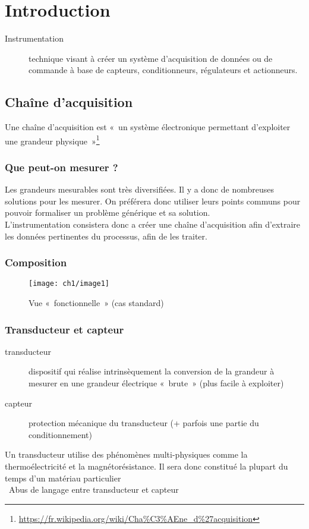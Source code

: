 \chapter{Introduction}
\begin{description}
	\item[Instrumentation] technique visant à créer un système d'acquisition de données ou de commande à base de capteurs, conditionneurs, régulateurs et actionneurs.
\end{description}
\section{Chaîne d’acquisition}
Une chaîne d'acquisition est «~un système électronique permettant d'exploiter une grandeur physique~»\footnote{\url{https://fr.wikipedia.org/wiki/Cha\%C3\%AEne_d\%27acquisition}}
\subsection{Que peut-on mesurer ?}
Les grandeurs mesurables sont très diversifiées. Il y a donc de nombreuses solutions pour les mesurer. On préférera donc utiliser leurs points communs pour pouvoir formaliser un problème générique et sa solution.\\

L'instrumentation consistera donc a créer une chaîne d'acquisition afin d'extraire les données
pertinentes du processus, afin de les traiter.
\subsection{Composition}
\begin{figure}[H] 
	\centering 
	\texttt{[image: ch1/image1]}
	\caption{Vue «~fonctionnelle~» (cas standard)} 
\end{figure}
\subsection{Transducteur et capteur}
\begin{description}
	\item[transducteur] dispositif qui réalise intrinsèquement la conversion de la grandeur à mesurer en une grandeur électrique «~brute~» (plus facile à exploiter)
	\item[capteur] protection mécanique du transducteur (+ parfois une partie du conditionnement)
\end{description}
Un transducteur utilise des phénomènes multi-physiques comme la thermoélectricité et la magnétorésistance. Il sera donc constitué la plupart du temps d'un matériau particulier\\
\danger\ Abus de langage entre transducteur et capteur \danger
